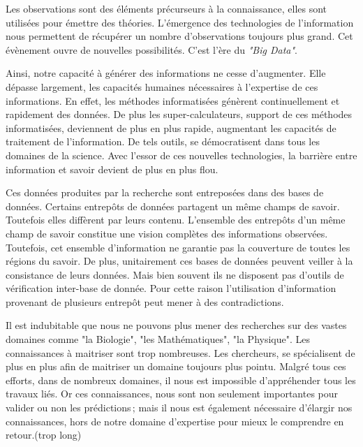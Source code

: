 \begin{refsection}
Les observations sont des éléments précurseurs à la connaissance, elles sont utilisées pour émettre des théories. L'émergence des technologies de l'information nous permettent de récupérer un nombre d'observations toujours plus grand. Cet évènement ouvre de nouvelles possibilités. C'est l'ère du \textit{"Big Data"}.

Ainsi, notre capacité à générer des informations ne cesse d'augmenter. Elle dépasse largement, les capacités humaines nécessaires à l'expertise de ces informations. En effet, les méthodes informatisées génèrent continuellement et rapidement des données. De plus les super-calculateurs, support de ces méthodes informatisées, deviennent de plus en plus rapide, augmentant les capacités de traitement de l'information. De tels outils, se démocratisent dans tous les domaines de la science. Avec l'essor de ces nouvelles technologies, la barrière entre information et savoir devient de plus en plus flou.


Ces données produites par la recherche sont entreposées dans des bases de données. Certains entrepôts de données partagent un même champs de savoir. Toutefois elles diffèrent par leurs contenu. L'ensemble des entrepôts d'un même champ de savoir constitue une vision complètes des informations observées. Toutefois, cet ensemble d'information ne garantie pas la couverture de toutes les régions du savoir. De plus, unitairement ces bases de données peuvent veiller à la consistance de leurs données. Mais bien souvent ils ne disposent pas d'outils de vérification inter-base de donnée. Pour cette raison l'utilisation d'information provenant de plusieurs entrepôt peut mener à des contradictions. 

Il est indubitable que nous ne pouvons plus mener des recherches sur des vastes domaines comme "la Biologie", "les Mathématiques", "la Physique". Les connaissances à maitriser sont trop nombreuses. Les chercheurs, se spécialisent de plus en plus afin de maitriser un domaine toujours plus pointu. Malgré tous ces efforts, dans de nombreux domaines, il nous est impossible d'appréhender tous les travaux liés. Or ces connaissances, nous sont non seulement
importantes pour valider ou non les prédictions ; mais il nous est également nécessaire d'élargir nos connaissances, hors de notre domaine d'expertise pour mieux le comprendre en retour.(trop long)


\end{refsection}
